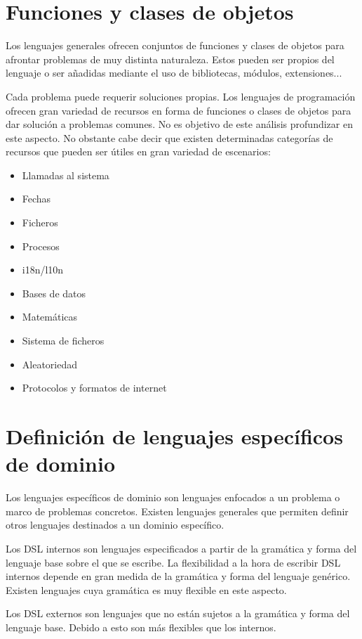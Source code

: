 \section{Funciones y clases de objetos}
Los lenguajes generales ofrecen conjuntos de funciones y clases de objetos para afrontar problemas de muy distinta naturaleza. Estos pueden 
ser propios del lenguaje o ser añadidas mediante el uso de bibliotecas, módulos, extensiones... 

Cada problema puede requerir soluciones propias. Los lenguajes de programación ofrecen gran variedad de recursos en
forma de funciones o clases de objetos para dar solución a problemas comunes. No es objetivo de este análisis profundizar en este aspecto. 
No obstante cabe decir que existen determinadas categorías de recursos que pueden ser útiles en gran variedad de escenarios:

\begin{itemize}
   \item Llamadas al sistema
   \item Fechas
   \item Ficheros
   \item Procesos
   \item i18n/l10n
   \item Bases de datos 
   \item Matemáticas 
   \item Sistema de ficheros 
   \item Aleatoriedad 
   \item Protocolos y formatos de internet 
\end{itemize}

\section{Definición de lenguajes específicos de dominio}
Los lenguajes específicos de dominio son lenguajes enfocados a un problema
o marco de problemas concretos. Existen lenguajes generales que permiten definir 
otros lenguajes destinados a un dominio específico. 

Los DSL internos son lenguajes especificados a partir de la gramática y forma del
lenguaje base sobre el que se escribe. La flexibilidad a la hora de escribir DSL internos depende en 
gran medida de la gramática y forma del lenguaje genérico. Existen lenguajes cuya 
gramática es muy flexible en este aspecto.

Los DSL externos son lenguajes que no están sujetos a la gramática y forma del 
lenguaje base. Debido a esto son más flexibles que los internos.

